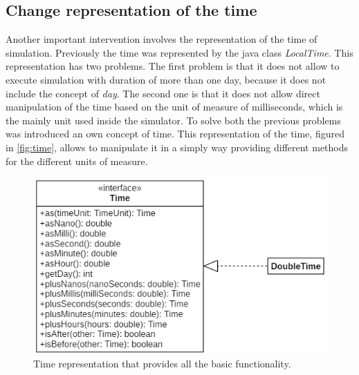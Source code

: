 \subsection{Change representation of the time}
Another important intervention involves the representation of the time of simulation. Previously the time was represented by the java class \mbox{\textit{LocalTime}}. This representation has two problems. 
The first problem is that it does not allow to execute simulation with duration of more than one day, because it does not include the concept of \textit{day}. 
The second one is that it does not allow direct manipulation of the time based on the unit of measure of milliseconds, which is the mainly unit used inside the simulator.
To solve both the previous problems was introduced an own concept of time. 
This representation of the time, figured in \autoref{fig:time}, allows to manipulate it in a simply way providing different methods for the different units of measure.
\begin{figure}[h]
    \centering
    \includegraphics{figures/time.png}
    \caption[Time representation in DingNet simulator]{Time representation that provides all the basic functionality.}
    \label{fig:time}
\end{figure}


